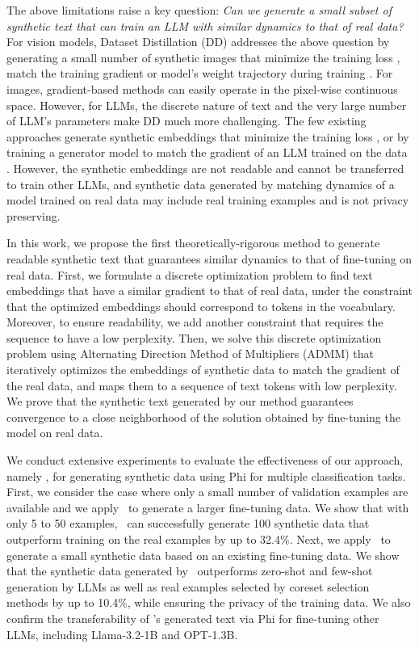 %
%
%
%
%
%
%
The above limitations raise a key question: \textit{Can we generate a small subset of synthetic text that can train an LLM with similar dynamics to that of real data?}
For vision models, Dataset Distillation (DD) addresses the above question by generating a small number of synthetic images that minimize the training loss \cite{wang2018dataset,loo2022efficient,nguyen2020dataset}, match the training gradient \cite{zhao2020dataset,zhao2021dataset} or model's weight trajectory during training \cite{cazenavette2022dataset,wang2022cafe}. 
For images, gradient-based methods can easily operate in the pixel-wise continuous space.
However, for LLMs, the discrete nature of text and the very large number of LLM's parameters make DD much more challenging. 
%
The few existing approaches generate synthetic embeddings that minimize the training loss \cite{sucholutsky2021soft,li2021data,sahni2023exploring,maekawa2023dataset}, or by training a generator model to match the gradient of an LLM trained on the data %
%
\cite{maekawa2024dilm}. However, the synthetic embeddings are not readable and cannot be transferred to train other LLMs, and synthetic data generated by matching dynamics of a model trained on real data may include real training examples and is not privacy preserving.
%

In this work, we propose the first theoretically-rigorous method to generate readable synthetic text that guarantees similar dynamics to that of fine-tuning on real data.
First, we formulate a discrete optimization problem to find text embeddings that have a similar gradient to that of real data, under the constraint that the optimized embeddings should correspond to tokens in the vocabulary. Moreover, to ensure readability, we add another constraint that requires the sequence to have a low perplexity.
%
%
Then, we solve this discrete optimization problem using Alternating Direction Method of Multipliers (ADMM) that iteratively optimizes the embeddings of synthetic data to match the gradient of the real data, and maps them to a sequence of text tokens with low perplexity. We prove that the synthetic text generated by our method guarantees convergence to a close neighborhood of the solution obtained by fine-tuning the model on real data.

We conduct extensive experiments to evaluate the effectiveness of our approach, namely \alg, for generating synthetic data using Phi for multiple classification %
tasks. %
First, we consider the case where only a small number of validation examples are available and we apply \alg\ to generate a larger fine-tuning data. We show that with only 5 to 50 examples, \alg\ can successfully generate 100 %
synthetic data that outperform training on the real examples by up to 32.4\%. 
%
Next, we apply \alg\ to generate a small synthetic data based on an existing fine-tuning data. We show that the synthetic data generated by \alg\ outperforms zero-shot and few-shot generation by LLMs as well as real examples selected by coreset selection methods by up to 10.4\%, while ensuring the privacy of the training data. 
%
We also confirm the transferability of \alg's  generated text via Phi for fine-tuning other LLMs, including Llama-3.2-1B and OPT-1.3B.




